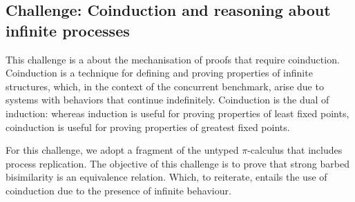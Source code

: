 \subsection{Challenge: Coinduction and reasoning about infinite processes}
\label{sec:challenge:coinduction}


This challenge is a about the mechanisation of proofs
that require coinduction.
%
Coinduction is a technique for defining and proving properties of
infinite structures,
%
which, in the context of the concurrent benchmark, arise
due to systems with behaviors that continue indefinitely.
%
Coinduction is the dual of induction: whereas induction is useful for
proving properties of least fixed points, coinduction is useful for
proving properties of greatest fixed points.
%
%

For this challenge, we adopt a fragment of the untyped $\pi$-calculus
that includes process replication.
The objective of this challenge is to prove that strong barbed
bisimilarity
is an equivalence relation. Which, to reiterate, entails the use of
coinduction due to the presence of infinite behaviour.

